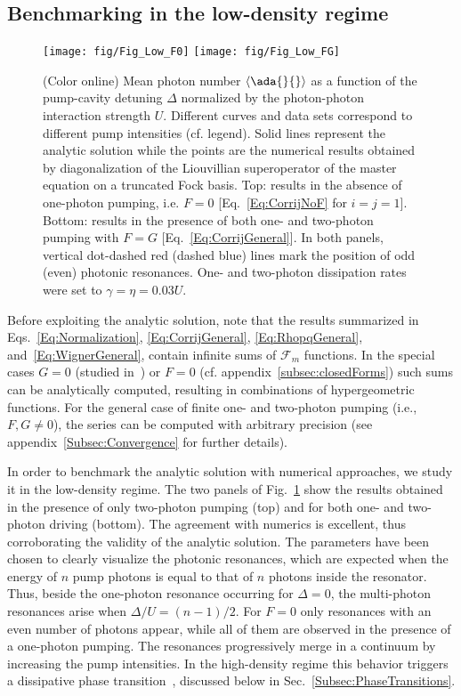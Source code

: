 \subsection{Benchmarking in the low-density regime}

\begin{figure}[t]
	\texttt{[image: fig/Fig\_Low\_F0]}\vspace{0.3cm}
	\texttt{[image: fig/Fig\_Low\_FG]}
	\caption{(Color online)
		Mean photon number $\braket{\ada{}{}}$ as a function of the pump-cavity detuning $\Delta$ normalized by the photon-photon interaction strength $U$.
		Different curves and data sets correspond to different pump intensities (cf. legend).
		Solid lines represent the analytic solution while the points are the numerical results obtained by diagonalization of the Liouvillian superoperator of the master equation on a truncated Fock basis.
		Top: results in the absence of one-photon pumping, i.e. $F=0$ [Eq.~\eqref{Eq:CorrijNoF} for $i=j=1$].
		Bottom: results in the presence of both one- and two-photon pumping with $F=G$ [Eq.~\eqref{Eq:CorrijGeneral}].
		In both panels, vertical dot-dashed red (dashed blue) lines mark the position of odd (even) photonic resonances.
		One- and two-photon dissipation rates were set to $\gamma=\eta=0.03U$.}
	\label{Fig:Numerics}
\end{figure}


Before exploiting the analytic solution, note that the results summarized in   Eqs.~\eqref{Eq:Normalization}, \eqref{Eq:CorrijGeneral}, \eqref{Eq:RhopqGeneral}, and~\eqref{Eq:WignerGeneral}, contain infinite sums of $\mathcal{F}_m$ functions.
In the special cases $G=0$ (studied in~\cite{DrummondJPA80a}) or $F=0$ (cf. appendix~\ref{subsec:closedForms}) such sums can be analytically computed, resulting in combinations of hypergeometric functions.
For the general case of finite one- and two-photon pumping (i.e., $F,G\neq0$), the series can be computed with arbitrary precision (see appendix~\ref{Subsec:Convergence} for further details).

In order to benchmark the analytic solution with numerical approaches, we study it in the low-density regime.
The two panels of Fig.~\ref{Fig:Numerics} show the results obtained in the presence of only two-photon pumping (top) and for both one- and two-photon driving (bottom).
The agreement with numerics is excellent, thus corroborating the validity of the analytic solution.
The parameters have been chosen to clearly visualize the photonic resonances, which are expected when the energy of $n$ pump photons is equal to that of $n$ photons inside the resonator.
Thus, beside the one-photon resonance occurring for $\Delta=0$, the multi-photon resonances arise when $\Delta/U=(n-1)/2$.
For $F=0$ only resonances with an even number of photons appear, while all of them are observed in the presence of a one-photon pumping.
The resonances progressively merge in a continuum by increasing the pump intensities.
In the high-density regime this behavior triggers a dissipative phase transition~\cite{CarmichaelPRX15}, discussed below in Sec.~\ref{Subsec:PhaseTransitions}.

